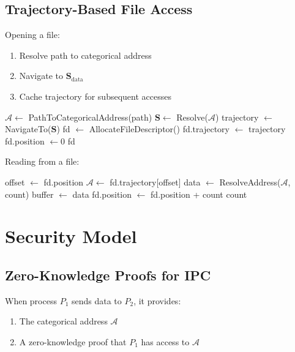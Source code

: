 \documentclass[twocolumn,10pt]{article}
\theoremstyle{definition}
\theoremstyle{remark}
\newcommand{\cataddr}{\mathcal{A}}
\newcommand{\Scoord}{\mathbf{S}}
\begin{document}
\subsection{Trajectory-Based File Access}

Opening a file:
\begin{enumerate}
    \item Resolve path to categorical address
    \item Navigate to $\Scoord_{\text{data}}$
    \item Cache trajectory for subsequent accesses
\end{enumerate}

\begin{algorithm}
\caption{Open File}
\begin{algorithmic}[1]
    \State $\cataddr \gets$ PathToCategoricalAddress(path)
    \State $\Scoord \gets$ Resolve($\cataddr$)
    \State trajectory $\gets$ NavigateTo($\Scoord$)
    \State fd $\gets$ AllocateFileDescriptor()
    \State fd.trajectory $\gets$ trajectory
    \State fd.position $\gets 0$
    \State \Return fd
\EndFunction
\end{algorithmic}
\end{algorithm}

Reading from a file:
\begin{algorithm}
\caption{Read File}
\begin{algorithmic}[1]
    \State offset $\gets$ fd.position
    \State $\cataddr \gets$ fd.trajectory[offset]
    \State data $\gets$ ResolveAddress($\cataddr$, count)
    \State buffer $\gets$ data
    \State fd.position $\gets$ fd.position + count
    \State \Return count
\EndFunction
\end{algorithmic}
\end{algorithm}

\section{Security Model}
\label{sec:security}

\subsection{Zero-Knowledge Proofs for IPC}

When process $P_1$ sends data to $P_2$, it provides:
\begin{enumerate}
    \item The categorical address $\cataddr$
    \item A zero-knowledge proof that $P_1$ has access to $\cataddr$
\end{enumerate}
\end{document}
